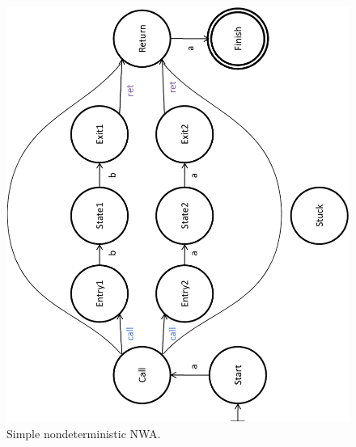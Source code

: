 \documentclass{llncs}
\begin{document}
\begin{figure}[p]
  \centering
    \includegraphics[width=12cm]{Figures/Figure16}
  \caption{Simple nondeterministic NWA.}
  \label{Fig:Det1}
\end{figure}
\end{document}
